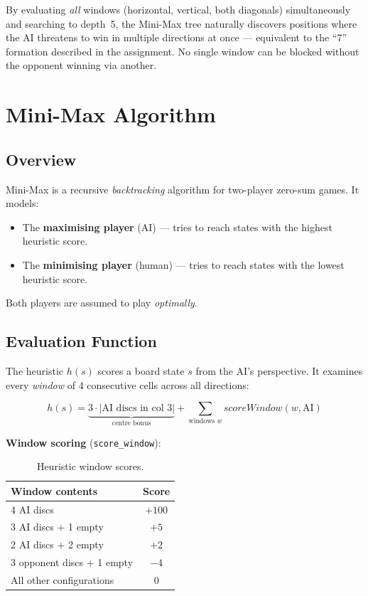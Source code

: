 \documentclass[12pt]{article}
\begin{document}
By evaluating \emph{all} windows (horizontal, vertical, both diagonals)
simultaneously and searching to depth~5, the Mini-Max tree naturally
discovers positions where the AI threatens to win in multiple directions at
once --- equivalent to the ``7'' formation described in the assignment.
No single window can be blocked without the opponent winning via another.

\section{Mini-Max Algorithm}

\subsection{Overview}

Mini-Max is a recursive \emph{backtracking} algorithm for two-player
zero-sum games.  It models:
\begin{itemize}
    \item The \textbf{maximising player} (AI) --- tries to reach states with
          the highest heuristic score.
    \item The \textbf{minimising player} (human) --- tries to reach states
          with the lowest heuristic score.
\end{itemize}

Both players are assumed to play \emph{optimally}.

\subsection{Evaluation Function}

The heuristic $h(s)$ scores a board state $s$ from the AI's perspective.
It examines every \emph{window} of 4 consecutive cells across all directions:

\begin{equation}
h(s) = \underbrace{3 \cdot |\text{AI discs in col 3}|}_{\text{centre bonus}}
     + \sum_{\text{windows } w} \textit{scoreWindow}(w, \text{AI})
\end{equation}

\textbf{Window scoring} (\texttt{score\_window}):

\begin{table}[H]
\centering
\begin{tabular}{@{} l c @{}}
\toprule
\textbf{Window contents} & \textbf{Score} \\
\midrule
4 AI discs                         & $+100$ \\
3 AI discs $+$ 1 empty             & $+5$   \\
2 AI discs $+$ 2 empty             & $+2$   \\
3 opponent discs $+$ 1 empty       & $-4$   \\
All other configurations           & $0$    \\
\bottomrule
\end{tabular}
\caption{Heuristic window scores.}
\end{table}
\end{document}
